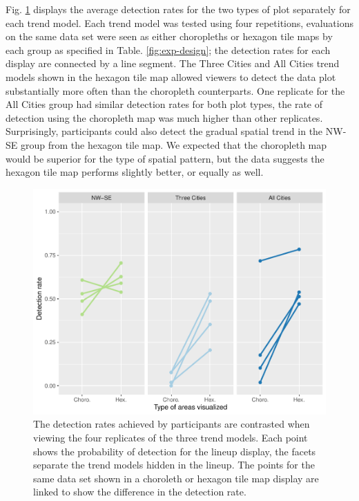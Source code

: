 \documentclass[conference,final,]{IEEEtran}
\begin{document}
Fig. \ref{fig:detect-compare} displays the average detection rates for the two types of plot separately for each trend model. Each trend model was tested using four repetitions, evaluations on the same data set were seen as either choropleths or hexagon tile maps by each group as specified in Table. \ref{fig:exp-design}; the detection rates for each display are connected by a line segment. The Three Cities and All Cities trend models shown in the hexagon tile map allowed viewers to detect the data plot substantially more often than the choropleth counterparts. One replicate for the All Cities group had similar detection rates for both plot types, the rate of detection using the choropleth map was much higher than other replicates. Surprisingly, participants could also detect the gradual spatial trend in the NW-SE group from the hexagon tile map. We expected that the choropleth map would be superior for the type of spatial pattern, but the data suggests the hexagon tile map performs slightly better, or equally as well.

\begin{figure}
\includegraphics[width=1\linewidth]{paper_files/figure-latex/detect-compare-1} \caption{The detection rates achieved by participants are contrasted when viewing the four replicates of the three trend models. Each point shows the probability of detection for the lineup display, the facets separate the trend models hidden in the lineup. The points for the same data set shown in a choroleth or hexagon tile map display are linked to show the difference in the detection rate.}\label{fig:detect-compare}
\end{figure}
\end{document}
